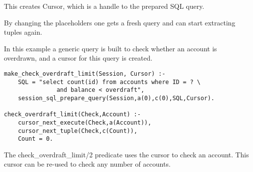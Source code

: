 This creates Cursor, which is a handle to the prepared SQL query.

By changing the placeholders one gets a fresh query and can start extracting
tuples again.


In this example a generic query is built to check whether an account is
overdrawn, and a cursor for this query is created.
\begin{verbatim}
make_check_overdraft_limit(Session, Cursor) :-
    SQL = "select count(id) from accounts where ID = ? \
               and balance < overdraft",
    session_sql_prepare_query(Session,a(0),c(0),SQL,Cursor).

check_overdraft_limit(Check,Account) :-
    cursor_next_execute(Check,a(Account)),
    cursor_next_tuple(Check,c(Count)),
    Count = 0.
\end{verbatim}
The check_overdraft_limit/2 predicate uses the cursor to check an account.
This cursor can be re-used to check any number of accounts.


